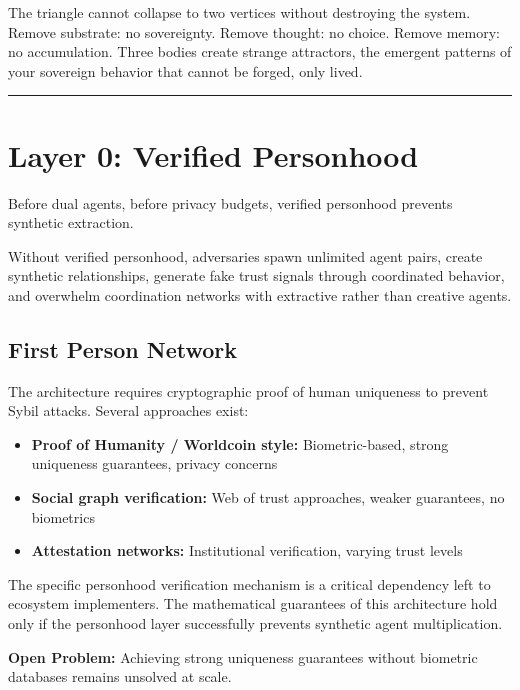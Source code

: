 \documentclass[
]{article}
\providecommand{\tightlist}{%
  \setlength{\itemsep}{0pt}\setlength{\parskip}{0pt}}
\begin{document}
The triangle cannot collapse to two vertices without destroying the
system. Remove substrate: no sovereignty. Remove thought: no choice.
Remove memory: no accumulation. Three bodies create strange attractors,
the emergent patterns of your sovereign behavior that cannot be forged,
only lived.

\begin{center}\rule{0.5\linewidth}{0.5pt}\end{center}

\section{Layer 0: Verified
Personhood}\label{layer-0-verified-personhood}

Before dual agents, before privacy budgets, verified personhood prevents
synthetic extraction.

Without verified personhood, adversaries spawn unlimited agent pairs,
create synthetic relationships, generate fake trust signals through
coordinated behavior, and overwhelm coordination networks with
extractive rather than creative agents.

\subsection{First Person Network}\label{first-person-network}

The architecture requires cryptographic proof of human uniqueness to
prevent Sybil attacks. Several approaches exist:

\begin{itemize}
\tightlist
\item
  \textbf{Proof of Humanity / Worldcoin style:} Biometric-based, strong
  uniqueness guarantees, privacy concerns
\item
  \textbf{Social graph verification:} Web of trust approaches, weaker
  guarantees, no biometrics
\item
  \textbf{Attestation networks:} Institutional verification, varying
  trust levels
\end{itemize}

The specific personhood verification mechanism is a critical dependency
left to ecosystem implementers. The mathematical guarantees of this
architecture hold only if the personhood layer successfully prevents
synthetic agent multiplication.

\textbf{Open Problem:} Achieving strong uniqueness guarantees without
biometric databases remains unsolved at scale.
\end{document}
